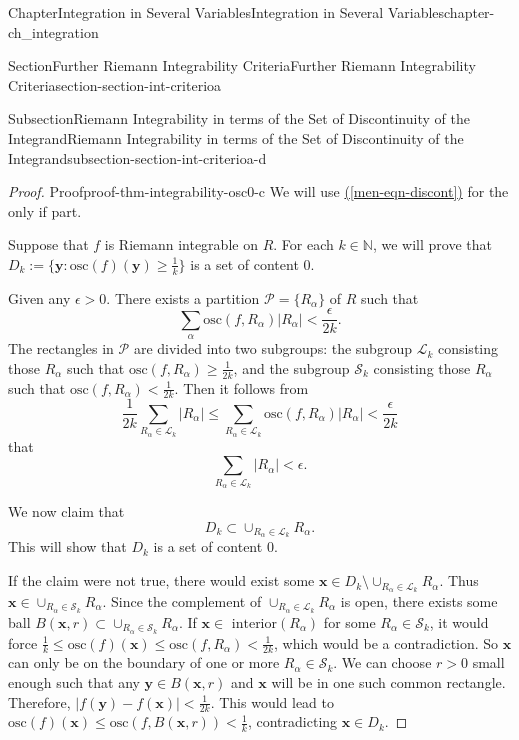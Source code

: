 \documentclass[oneside,10pt,]{book}
\newcommand{\xreffont}{\relax}
\numberwithin{equation}{section}
\newcommand{\bx}{\mathbf{x}}
\newcommand{\by}{\mathbf{y}}
\newcommand{\bbN}{\mathbb{N}}
\newcommand{\cL}{\mathcal{L}}
\newcommand{\cP}{\mathcal{P}}
\newcommand{\cS}{\mathcal{S}}
\newcommand{\osc}{\text{osc}}
\begin{document}
\begin{chapterptx}{Chapter}{Integration in Several Variables}{}{Integration in Several Variables}{}{}{chapter-ch_integration}
\begin{sectionptx}{Section}{Further Riemann Integrability Criteria}{}{Further Riemann Integrability Criteria}{}{}{section-section-int-criterioa}
\begin{subsectionptx}{Subsection}{Riemann Integrability in terms of the Set of Discontinuity of the Integrand}{}{Riemann Integrability in terms of the Set of Discontinuity of the Integrand}{}{}{subsection-section-int-criterioa-d}
\begin{proof}{Proof}{}{proof-thm-integrability-osc0-c}
We will use \hyperref[men-eqn-discont]{({\xreffont\ref{men-eqn-discont}})} for the only if part.%
\par
Suppose that \(f\) is Riemann integrable on \(R\). For each \(k\in \bbN\), we will prove that \(D_{k}:=\{\by: \osc(f)(\by)\ge \frac 1k\}\) is a set of content \(0\).%
\par
Given any \(\epsilon >0\). There exists a partition \(\cP=\{R_{\alpha}\}\) of \(R\) such that%
\begin{equation*}
\sum_{\alpha} \osc(f, R_{\alpha})\vert R_{\alpha} \vert < \frac{\epsilon}{2k}.
\end{equation*}
The rectangles in \(\cP\) are divided into two subgroups: the subgroup \(\cL_{k}\) consisting those \(R_{\alpha}\) such that \(\osc(f, R_{\alpha})\ge \frac{1}{2k}\), and the subgroup \(\cS_{k}\) consisting those \(R_{\alpha}\) such that \(\osc(f, R_{\alpha})< \frac{1}{2k}\). Then it follows from%
\begin{equation*}
\frac{1}{2k} \sum_{R_{\alpha}\in \cL_{k} } \vert R_{\alpha} \vert \le
\sum_{R_{\alpha}\in \cL_{k} } \osc(f, R_{\alpha})\vert R_{\alpha} \vert < \frac{\epsilon}{2k}
\end{equation*}
that%
\begin{equation*}
\sum_{R_{\alpha}\in \cL_{k} } \vert R_{\alpha} \vert < \epsilon.
\end{equation*}
%
\par
We now claim that%
\begin{equation*}
D_{k}\subset \cup_{R_{\alpha}\in \cL_{k} } R_{\alpha}.
\end{equation*}
This will show that \(D_{k}\) is a set of content \(0\).%
\par
If the claim were not true, there would exist some \(\bx \in D_{k}
\setminus \cup_{R_{\alpha}\in \cL_{k} } R_{\alpha}\). Thus \(\bx \in \cup_{R_{\alpha}\in \cS_{k} } R_{\alpha}\). Since the complement of \(\cup_{R_{\alpha}\in \cL_{k} } R_{\alpha}\) is open, there exists some ball \(B(\bx, r)
\subset \cup_{R_{\alpha}\in \cS_{k} } R_{\alpha}\). If \(\bx\in \text{ interior}(R_{\alpha})\) for some \(R_{\alpha} \in \cS_{k}\), it would force \(\frac 1k \le \osc(f)(\bx)\le \osc(f, R_{\alpha}) < \frac{1}{2k}\), which would be a contradiction. So \(\bx\) can only be on the boundary of one or more \(R_{\alpha} \in \cS_{k}\). We can choose \(r>0\) small enough such that any \(\by\in B(\bx, r)\) and \(\bx\) will be in one such common rectangle. Therefore, \(\vert f(\by)-f(\bx)\vert < \frac{1}{2k}\). This would lead to \(\osc(f)(\bx)\le \osc(f, B(\bx, r)) < \frac 1k\), contradicting \(\bx \in D_{k}\).%

\end{proof}
\end{subsectionptx}
\end{sectionptx}
\end{chapterptx}
\end{document}
